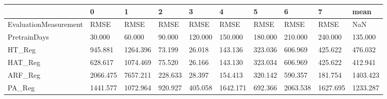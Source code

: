 \begin{tabular}{llllllllll}
\toprule
{} &        0 &        1 &       2 &       3 &        4 &       5 &        6 &        7 &     mean \\
\midrule
EvaluationMeasurement &     RMSE &     RMSE &    RMSE &    RMSE &     RMSE &    RMSE &     RMSE &     RMSE &      NaN \\
PretrainDays          &   30.000 &   60.000 &  90.000 & 120.000 &  150.000 & 180.000 &  210.000 &  240.000 &  135.000 \\
HT\_Reg                &  945.881 & 1264.396 &  73.199 &  26.018 &  143.136 & 323.036 &  606.969 &  425.622 &  476.032 \\
HAT\_Reg               &  628.617 & 1074.469 &  75.520 &  26.166 &  143.130 & 323.034 &  606.969 &  425.622 &  412.941 \\
ARF\_Reg               & 2066.475 & 7657.211 & 228.633 &  28.397 &  154.413 & 320.142 &  590.357 &  181.754 & 1403.423 \\
PA\_Reg                & 1441.577 & 1072.964 & 920.927 & 405.058 & 1642.171 & 692.366 & 2063.538 & 1627.695 & 1233.287 \\
\bottomrule
\end{tabular}
